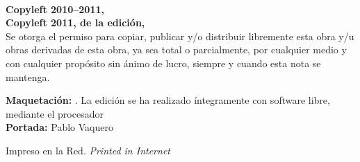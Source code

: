 \noindent
\textbf{\thetitle}\\
\theauthor

\bigskip\bigskip\footnotesize\noindent
\textbf{Copyleft \copyleft{} 2010--2011, \theauthor}\\
\textbf{Copyleft \copyleft{} 2011, de la edición, \theeditor}\\
Se otorga el permiso para copiar, publicar y/o distribuir libremente esta obra y/u obras derivadas de esta obra, ya sea total o parcialmente, por cualquier medio y con cualquier propósito sin ánimo de lucro, siempre y cuando esta nota se mantenga.

\bigskip\noindent
\textbf{Maquetación:} \theeditor. La edición se ha realizado íntegramente con software libre, mediante el procesador \emph{\LaTeXe}\\
\textbf{Portada:} Pablo Vaquero

\bigskip\noindent
Impreso en la Red. \emph{Printed in Internet}
\normalsize
{}

\endinput
